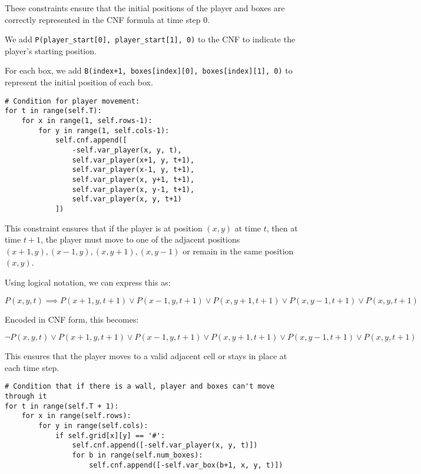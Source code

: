 \documentclass[12pt,a4paper]{article}
\begin{document}
These constraints ensure that the initial positions of the player and boxes are correctly represented in the CNF formula at time step 0.  

We add \texttt{P(player\_start[0], player\_start[1], 0)} to the CNF to indicate the player's starting position.  

For each box, we add \texttt{B(index+1, boxes[index][0], boxes[index][1], 0)} to represent the initial position of each box.



\begin{lstlisting}
# Condition for player movement:
for t in range(self.T):
    for x in range(1, self.rows-1):
        for y in range(1, self.cols-1):
            self.cnf.append([
                -self.var_player(x, y, t),
                self.var_player(x+1, y, t+1),
                self.var_player(x-1, y, t+1),
                self.var_player(x, y+1, t+1),
                self.var_player(x, y-1, t+1),
                self.var_player(x, y, t+1)
            ])
\end{lstlisting}

This constraint ensures that if the player is at position \((x,y)\) at time \(t\), then at time \(t+1\), the player must move to one of the adjacent positions \((x+1,y), (x-1,y), (x,y+1), (x,y-1)\) or remain in the same position \((x,y)\).

Using logical notation, we can express this as:

\[
P(x,y,t) \implies P(x+1,y,t+1) \lor P(x-1,y,t+1) \lor P(x,y+1,t+1) \lor P(x,y-1,t+1) \lor P(x,y,t+1)
\]

Encoded in CNF form, this becomes:

\[
\neg P(x,y,t) \lor P(x+1,y,t+1) \lor P(x-1,y,t+1) \lor P(x,y+1,t+1) \lor P(x,y-1,t+1) \lor P(x,y,t+1)
\]

\noindent This ensures that the player moves to a valid adjacent cell or stays in place at each time step.
\newpage



\begin{lstlisting}
# Condition that if there is a wall, player and boxes can't move through it
for t in range(self.T + 1):
    for x in range(self.rows):
        for y in range(self.cols):
            if self.grid[x][y] == '#':
                self.cnf.append([-self.var_player(x, y, t)])
                for b in range(self.num_boxes):
                    self.cnf.append([-self.var_box(b+1, x, y, t)])
\end{lstlisting}
\end{document}
